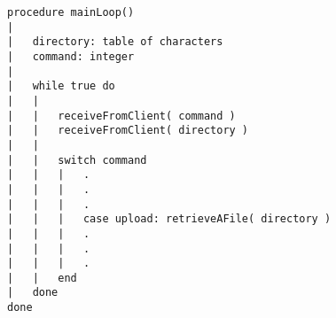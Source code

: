 \begin{lstlisting}[breaklines]
procedure mainLoop()
|
|	directory: table of characters
|	command: integer
|	
|	while true do
|	|
|	|	receiveFromClient( command )
|	|	receiveFromClient( directory )
|	|
|	|	switch command
|	|	|	.
|	|	|	.
|	|	|	.
|	|	|	case upload: retrieveAFile( directory )
|	|	|	.
|	|	|	.
|	|	|	.
|	|	end
|	done
done
\end{lstlisting}